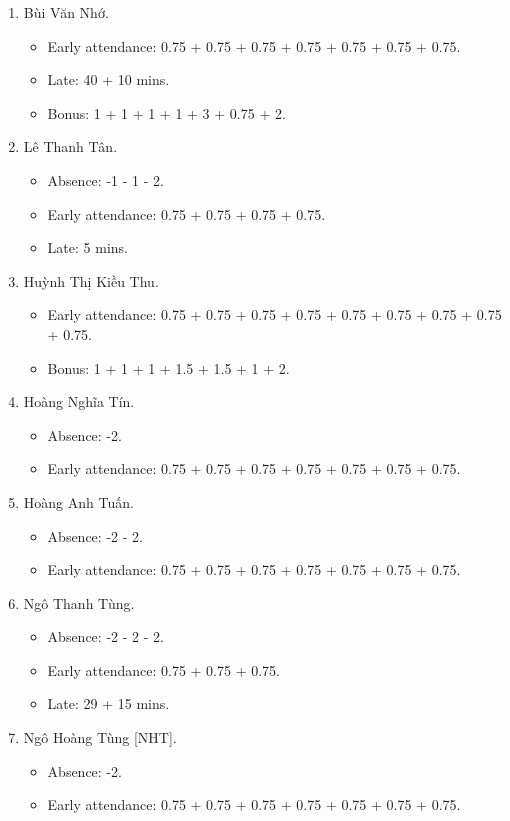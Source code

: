 \documentclass{article}
\begin{document}
\begin{enumerate}
	\item {\sc Bùi Văn Nhớ}.
	\begin{itemize}
		\item Early attendance: 0.75 + 0.75 + 0.75 + 0.75 + 0.75 + 0.75 + 0.75.
		\item Late: 40 + 10 mins.
		\item Bonus: 1 + 1 + 1 + 1 + 3 + 0.75 + 2.	
	\end{itemize}
	\item {\sc Lê Thanh Tân.}
	\begin{itemize}
		\item Absence: -1 - 1 - 2.
		\item Early attendance: 0.75 + 0.75 + 0.75 + 0.75.
		\item Late: 5 mins.
	\end{itemize}
	\item {\sc Huỳnh Thị Kiều Thu.}
	\begin{itemize}
		\item Early attendance: 0.75 + 0.75 + 0.75 + 0.75 + 0.75 + 0.75 + 0.75 + 0.75 + 0.75.
		\item Bonus: 1 + 1 + 1 + 1.5 + 1.5 + 1 + 2.
	\end{itemize}
	\item {\sc Hoàng Nghĩa Tín.}
	\begin{itemize}
        \item Absence: -2.
		\item Early attendance: 0.75 + 0.75 + 0.75 + 0.75 + 0.75 + 0.75 + 0.75.
	\end{itemize}
	\item {\sc Hoàng Anh Tuấn.}
	\begin{itemize}
		\item Absence: -2 - 2.
		\item Early attendance: 0.75 + 0.75 + 0.75 + 0.75 + 0.75 + 0.75 + 0.75.
	\end{itemize}
	\item {\sc Ngô Thanh Tùng.}
	\begin{itemize}
		\item Absence: -2 - 2 - 2.
		\item Early attendance: 0.75 + 0.75 + 0.75.
		\item Late: 29 + 15 mins.
	\end{itemize}
	\item {\sc Ngô Hoàng Tùng [NHT].}
	\begin{itemize}
        \item Absence: -2.
		\item Early attendance: 0.75 + 0.75 + 0.75 + 0.75 + 0.75 + 0.75 + 0.75.

\end{itemize}
\end{enumerate}
\end{document}
